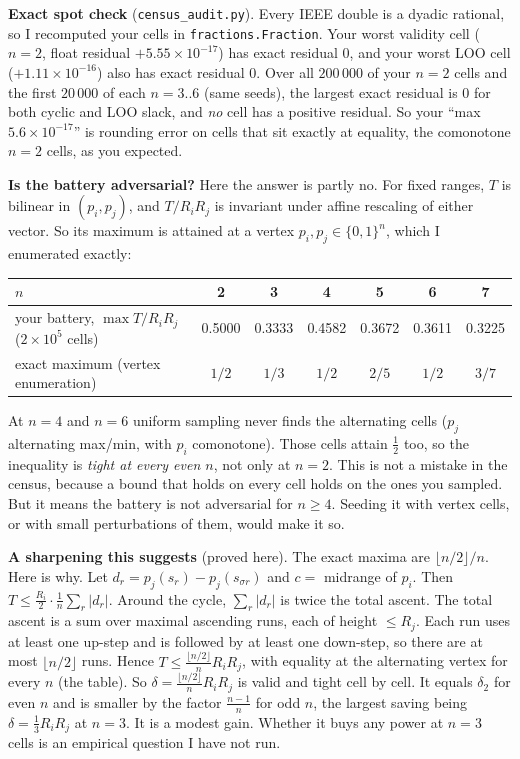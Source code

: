 \documentclass[11pt]{article}
\begin{document}
\textbf{Exact spot check} (\texttt{census\_audit.py}). Every IEEE double is a dyadic rational, so I recomputed your cells in \texttt{fractions.Fraction}.
Your worst validity cell ($n=2$, float residual $+5.55\times10^{-17}$) has exact residual $0$, and your worst LOO cell ($+1.11\times10^{-16}$) also has exact residual $0$.
Over all $200\,000$ of your $n=2$ cells and the first $20\,000$ of each $n=3..6$ (same seeds), the largest exact residual is $0$ for both cyclic and LOO slack, and \emph{no} cell has a positive residual.
So your ``max $5.6\times10^{-17}$'' is rounding error on cells that sit exactly at equality, the comonotone $n=2$ cells, as you expected.

\textbf{Is the battery adversarial?} Here the answer is partly no. For fixed ranges, $T$ is bilinear in $(p_i,p_j)$, and $T/R_iR_j$ is invariant under affine rescaling of either vector. So its maximum is attained at a vertex $p_i,p_j\in\{0,1\}^n$, which I enumerated exactly:
\begin{center}\small
\begin{tabular}{lcccccc}
\toprule
$n$ & 2 & 3 & 4 & 5 & 6 & 7\\
\midrule
your battery, $\max T/R_iR_j$ ($2\times10^5$ cells) & 0.5000 & 0.3333 & 0.4582 & 0.3672 & 0.3611 & 0.3225\\
exact maximum (vertex enumeration) & $1/2$ & $1/3$ & $1/2$ & $2/5$ & $1/2$ & $3/7$\\
\bottomrule
\end{tabular}
\end{center}
At $n=4$ and $n=6$ uniform sampling never finds the alternating cells ($p_j$ alternating max/min, with $p_i$ comonotone). Those cells attain $\tfrac12$ too, so the inequality is \emph{tight at every even $n$}, not only at $n=2$.
This is not a mistake in the census, because a bound that holds on every cell holds on the ones you sampled. But it means the battery is not adversarial for $n\ge4$. Seeding it with vertex cells, or with small perturbations of them, would make it so.

\textbf{A sharpening this suggests} (proved here). The exact maxima are $\lfloor n/2\rfloor/n$. Here is why. Let $d_r=p_j(s_r)-p_j(s_{\sigma r})$ and $c=$ midrange of $p_i$. Then $T\le\frac{R_i}{2}\cdot\frac1n\sum_r|d_r|$. Around the cycle, $\sum_r|d_r|$ is twice the total ascent. The total ascent is a sum over maximal ascending runs, each of height $\le R_j$. Each run uses at least one up-step and is followed by at least one down-step, so there are at most $\lfloor n/2\rfloor$ runs.
Hence $T\le\frac{\lfloor n/2\rfloor}{n}R_iR_j$, with equality at the alternating vertex for every $n$ (the table).
So $\delta=\frac{\lfloor n/2\rfloor}{n}R_iR_j$ is valid and tight cell by cell. It equals $\delta_2$ for even $n$ and is smaller by the factor $\frac{n-1}{n}$ for odd $n$, the largest saving being $\delta=\frac13R_iR_j$ at $n=3$.
It is a modest gain. Whether it buys any power at $n=3$ cells is an empirical question I have not run.
\end{document}
